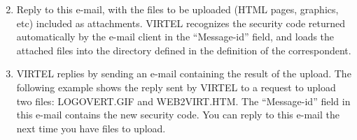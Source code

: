 \documentclass[letterpaper,10pt,english]{sphinxmanual}
\begin{document}
\begin{sphinxVerbatim}[commandchars=\\\{\}]
      
 
  
 
     
 
        
\end{sphinxVerbatim}

\begin{enumerate}
\setcounter{enumi}{1}
\item {} 
Reply to this e-mail, with the files to be uploaded (HTML pages, graphics, etc) included as attachments. VIRTEL recognizes the security code returned automatically by the e-mail client in the “Message-id” field, and loads the attached files into the directory defined in the definition of the correspondent.

\item {} 
VIRTEL replies by sending an e-mail containing the result of the upload. The following example shows the reply sent by VIRTEL to a request to upload two files: LOGOVERT.GIF and WEB2VIRT.HTM. The “Message-id” field in this e-mail contains the new security code. You can reply to this e-mail the next time you have files to upload.

\end{enumerate}
\end{document}
